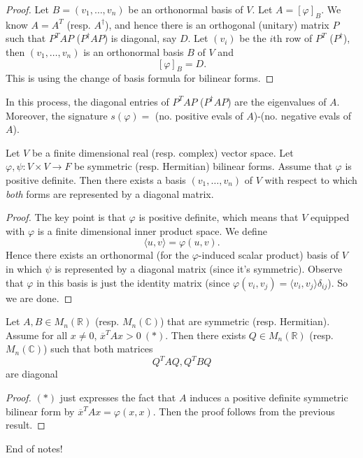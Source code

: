 \documentclass[a4paper]{scrartcl}
\begin{document}
\begin{proof}
      Let $B=(v_1,\ldots ,v_n)$ be an orthonormal basis of $V$. Let $A=[\varphi]_B$. We know $A=A^T$ (resp. $A^\dagger$), and hence there is an orthogonal (unitary) matrix $P$ such that $P^TAP$ ($P^\dagger AP$) is diagonal, say $D$. Let $(v_i)$ be the $i$th row of $P^T$ ($P^\dagger$), then $(v_1,\ldots , v_n)$ is an orthonormal basis $B$ of $V$ and 
      \[[\varphi]_B=D.\]
      This is using the change of basis formula for bilinear forms.
\end{proof}

\begin{remark}
      In this process, the diagonal entries of $P^TAP$ ($P^\dagger AP$) are the eigenvalues of $A$. Moreover, the signature $s (\varphi)=$ (no. positive evals of $A$)-(no. negative evals of $A$).
\end{remark}

\begin{corollary}
     Let $V$ be a finite dimensional real (resp. complex) vector space. Let $\varphi, \psi : V \times V \rightarrow F$ be symmetric (resp. Hermitian) bilinear forms. Assume that $\varphi$ is positive definite. Then there exists a basis $(v_1, \ldots ,v_n)$ of $V$ with respect to which \emph{both} forms are represented by a diagonal matrix. 
\end{corollary}
\begin{proof}
     The key point is that $\varphi$ is positive definite, which means that $V$ equipped with $\varphi$ is a finite dimensional inner product space. We define 
     \[\langle u,v \rangle =\varphi (u,v).\]
     Hence there exists an orthonormal (for the $\varphi$-induced scalar product) basis of $V$ in which $\psi$ is represented by a diagonal matrix (since it's symmetric). Observe that $\varphi$ in this basis is just the identity matrix (since $\varphi (v_i,v_j)=\langle v_i,v_j \rangle \delta_{ij}$). So we are done.
\end{proof}
\begin{corollary}
     Let $A,B \in M_n (\mathbb{R})$ (resp. $M_n (\mathbb{C})$) that are symmetric (resp. Hermitian). Assume for all $x \neq 0$, $\overline{x} ^TAx>0 \ (\ast)$. Then there exists $Q \in M_n (\mathbb{R})$ (resp. $M_n (\mathbb{C})$) such that both matrices 
     \[Q^TAQ, Q^TBQ\]
     are diagonal
\end{corollary}
\begin{proof}
      $(\ast)$ just expresses the fact that $A$ induces a positive definite symmetric bilinear form by $\overline{x} ^T Ax=\varphi (x,x)$. Then the proof follows from the previous result.
\end{proof}

\begin{remark}
      End of notes!
\end{remark}
\end{document}
